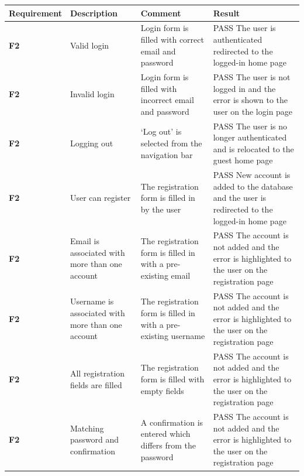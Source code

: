\begin{longtabu} to \textwidth {XXXX}
\hline
Requirement & Description & Comment & Result \\ 
\hline
\textbf{F2} & Valid login & Login form is filled with correct email and password & \textcolor{passgreen}{PASS} The user is authenticated redirected to the logged-in home page \vspace{2mm}\\
\textbf{F2} & Invalid login & Login form is filled with incorrect email and password & \textcolor{passgreen}{PASS} The user is not logged in and the error is shown to the user on the login page \vspace{2mm}\\
\textbf{F2} & Logging out & `Log out' is selected from the navigation bar & \textcolor{passgreen}{PASS} The user is no longer authenticated and is relocated to the guest home page \vspace{2mm}\\
\textbf{F2} & User can register & The registration form is filled in by the user & \textcolor{passgreen}{PASS} New account is added to the database and the user is redirected to the logged-in home page \vspace{2mm}\\
\textbf{F2} & Email is associated with more than one account & The registration form is filled in with a pre-existing email & \textcolor{passgreen}{PASS} The account is not added and the error is highlighted to the user on the registration page \vspace{2mm}\\
\textbf{F2} & Username is associated with more than one account & The registration form is filled in with a pre-existing username & \textcolor{passgreen}{PASS} The account is not added and the error is highlighted to the user on the registration page \vspace{2mm}\\
\textbf{F2} & All registration fields are filled & The registration form is filled with empty fields & \textcolor{passgreen}{PASS} The account is not added and the error is highlighted to the user on the registration page \vspace{2mm}\\
\textbf{F2} & Matching password and confirmation & A confirmation is entered which differs from the password & \textcolor{passgreen}{PASS} The account is not added and the error is highlighted to the user on the registration page \vspace{2mm}\\

\end{longtabu}
